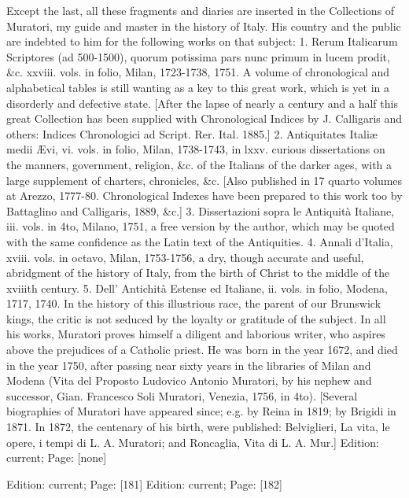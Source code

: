 {Except the last, all these fragments and diaries are inserted in the Collections of Muratori, my guide and master in the history of Italy. His country and the public are indebted to him for the following works on that subject: 1. Rerum Italicarum Scriptores (ad 500-1500), quorum potissima pars nunc primum in lucem prodit, \&c. xxviii. vols. in folio, Milan, 1723-1738, 1751. A volume of chronological and alphabetical tables is still wanting as a key to this great work, which is yet in a disorderly and defective state. [After the lapse of nearly a century and a half this great Collection has been supplied with Chronological Indices by J. Calligaris and others: Indices Chronologici ad Script. Rer. Ital. 1885.] 2. Antiquitates Italiæ medii Ævi, vi. vols. in folio, Milan, 1738-1743, in lxxv. curious dissertations on the manners, government, religion, \&c. of the Italians of the darker ages, with a large supplement of charters, chronicles, \&c. [Also published in 17 quarto volumes at Arezzo, 1777-80. Chronological Indexes have been prepared to this work too by Battaglino and Calligaris, 1889, \&c.] 3. Dissertazioni sopra le Antiquità Italiane, iii. vols. in 4to, Milano, 1751, a free version by the author, which may be quoted with the same confidence as the Latin text of the Antiquities. 4. Annali d\texthebrew{}’Italia, xviii. vols. in octavo, Milan, 1753-1756, a dry, though accurate and useful, abridgment of the history of Italy, from the birth of Christ to the middle of the xviiith century. 5. Dell\texthebrew{}’ Antichità Estense ed Italiane, ii. vols. in folio, Modena, 1717, 1740. In the history of this illustrious race, the parent of our Brunswick kings, the critic is not seduced by the loyalty or gratitude of the subject. In all his works, Muratori proves himself a diligent and laborious writer, who aspires above the prejudices of a Catholic priest. He was born in the year 1672, and died in the year 1750, after passing near sixty years in the libraries of Milan and Modena (Vita del Proposto Ludovico Antonio Muratori, by his nephew and successor, Gian. Francesco Soli Muratori, Venezia, 1756, in 4to). [Several biographies of Muratori have appeared since; e.g. by Reina in 1819; by Brigidi in 1871. In 1872, the centenary of his birth, were published: Belviglieri, La vita, le opere, i tempi di L. A. Muratori; and Roncaglia, Vita di L. A. Mur.]}
Edition: current; Page: [none]

Edition: current; Page: [181]
Edition: current; Page: [182]


